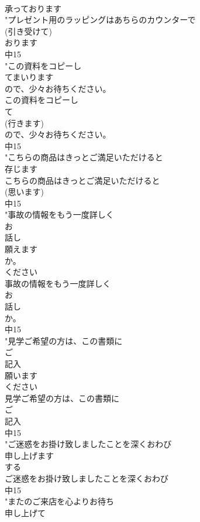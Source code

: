 \documentclass[8pt]{extreport}
\begin{document}
\begin{CJK}{UTF8}{min}
\\	承っております
\\	"プレゼント用のラッピングはあちらのカウンターで
\\	(引き受けて)
\\	おります
\\	中15
\\	"この資料をコピーし
\\	てまいります
\\	ので、少々お待ちください。
\\	この資料をコピーし
\\	て
\\	(行きます)
\\	ので、少々お待ちください。
\\	中15
\\	"こちらの商品はきっとご満足いただけると
\\	存じます
\\	こちらの商品はきっとご満足いただけると
\\	(思います)
\\	中15
\\	"事故の情報をもう一度詳しく
\\	お
\\	話し
\\	願えます
\\	か。
\\	ください　
\\	事故の情報をもう一度詳しく
\\	お
\\	話し
\\	か。
\\	中15
\\	"見学ご希望の方は、この書類に
\\	ご
\\	記入
\\	願います
\\	ください　
\\	見学ご希望の方は、この書類に
\\	ご
\\	記入
\\	中15
\\	"ご迷惑をお掛け致しましたことを深くおわび
\\	申し上げます
\\	する 
\\	ご迷惑をお掛け致しましたことを深くおわび
\\	中15
\\	"またのご来店を心よりお待ち
\\	申し上げて

\end{CJK}
\end{document}
